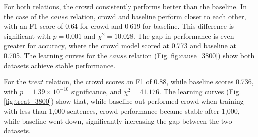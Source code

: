 \begin{table}[!htb]
\centering
{}
\caption{Model evaluation results over 3,984 sentences. Crowd scores are shown at 0.5 sentence-relation score threshold.}
\label{tab:statistic_bas}
\end{table}

For both relations, the crowd consistently performs better than the baseline. In the case of the $cause$ relation, crowd and baseline perform closer to each other, with an F1 score of 0.64 for crowd and 0.619 for baseline. This difference is significant with $ p = 0.001 $ and $\chi^2 = 10.028$. The gap in performance is even greater for accuracy, where the  crowd model scored at 0.773 and baseline at 0.705. The learning curves for the $cause$ relation (Fig.\ref{fig:cause_3800}) show both datasets achieve stable performance.

For the $treat$ relation, the crowd scores an F1 of 0.88, while baseline scores 0.736, with $p = 1.39 \times 10^{-10} $ significance, and $\chi^2 = 41.176$. The learning curves (Fig.\ref{fig:treat_3800}) show that, while baseline out-performed crowd when training with less than 1,000 sentences, crowd performance became stable after 1,000, while baseline went down, significantly increasing the gap between the two datasets.


